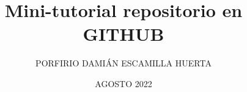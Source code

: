 

\title{Mini-tutorial repositorio en GITHUB}
\author{PORFIRIO DAMIÁN ESCAMILLA HUERTA}
\date{AGOSTO 2022}


	
	\maketitle
	
	
	
	
	

